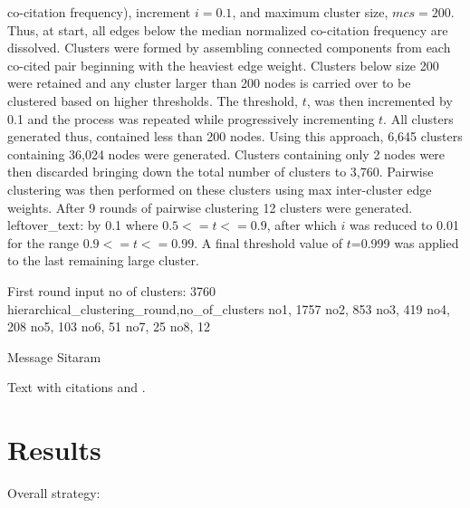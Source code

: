co-citation frequency), increment $i = 0.1$, and maximum cluster size, $mcs = 200$. Thus, at start, all edges below the median normalized co-citation frequency are dissolved. Clusters were formed by assembling connected components from each co-cited pair beginning with the heaviest edge weight. Clusters below size 200 were retained and any cluster larger than 200 nodes is carried over to be clustered based on higher thresholds. The threshold, $t$, was then incremented by 0.1 and the process was repeated while progressively incrementing $t$. All clusters generated thus, contained  less than 200 nodes.  Using this approach, 6,645 clusters containing 36,024 nodes were generated. Clusters containing only 2 nodes were then discarded bringing down the total number of clusters to 3,760. Pairwise clustering was then performed on these clusters using max inter-cluster edge weights. After 9 rounds of pairwise clustering 12 clusters were generated. {leftover\_text: by 0.1 where $0.5 <= t <= 0.9$, after which $i$ was reduced to 0.01 for the range $0.9 <= t <= 0.99$. A final threshold value of $t$=0.999 was applied to the last remaining large cluster.}

First round input no of clusters: 3760
hierarchical\_clustering\_round,no\_of\_clusters
no1, 1757
no2, 853
no3, 419
no4, 208
no5, 103
no6, 51
no7, 25
no8, 12




Message Sitaram



\label{sec:1}
Text with citations \cite{RefB} and \cite{RefJ}.

\section{Results}
\label{sec:2}

Overall strategy:

